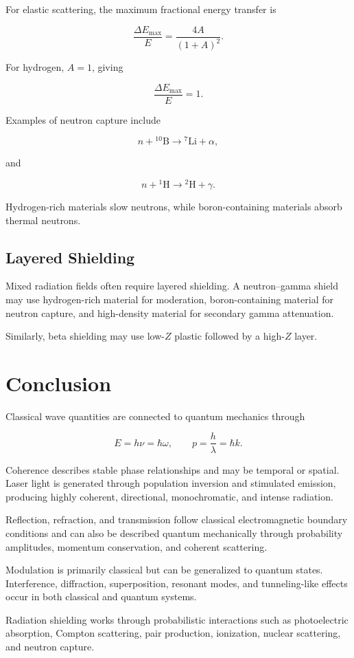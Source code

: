 \documentclass[12pt]{article}
\begin{document}
For elastic scattering, the maximum fractional energy transfer is

\begin{equation}
\boxed{
\frac{\Delta E_{\max}}{E}
=
\frac{4A}{(1+A)^2}
}.
\end{equation}

For hydrogen, $A=1$, giving

\begin{equation}
\frac{\Delta E_{\max}}{E}=1.
\end{equation}

Examples of neutron capture include

\begin{equation}
n+{}^{10}\mathrm{B}
\rightarrow
{}^7\mathrm{Li}+\alpha,
\end{equation}

and

\begin{equation}
n+{}^1\mathrm{H}
\rightarrow
{}^2\mathrm{H}+\gamma.
\end{equation}

Hydrogen-rich materials slow neutrons, while boron-containing materials absorb thermal neutrons.

\subsection{Layered Shielding}

Mixed radiation fields often require layered shielding. A neutron--gamma shield may use hydrogen-rich material for moderation, boron-containing material for neutron capture, and high-density material for secondary gamma attenuation.

Similarly, beta shielding may use low-$Z$ plastic followed by a high-$Z$ layer.

\section{Conclusion}

Classical wave quantities are connected to quantum mechanics through

\begin{equation}
E=h\nu=\hbar\omega,
\qquad
p=\frac{h}{\lambda}=\hbar k.
\end{equation}

Coherence describes stable phase relationships and may be temporal or spatial. Laser light is generated through population inversion and stimulated emission, producing highly coherent, directional, monochromatic, and intense radiation.

Reflection, refraction, and transmission follow classical electromagnetic boundary conditions and can also be described quantum mechanically through probability amplitudes, momentum conservation, and coherent scattering.

Modulation is primarily classical but can be generalized to quantum states. Interference, diffraction, superposition, resonant modes, and tunneling-like effects occur in both classical and quantum systems.

Radiation shielding works through probabilistic interactions such as photoelectric absorption, Compton scattering, pair production, ionization, nuclear scattering, and neutron capture.
\end{document}
